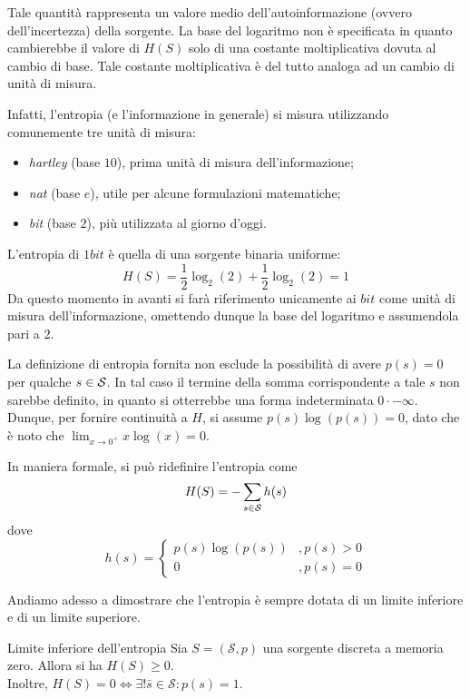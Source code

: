 Tale quantità rappresenta un valore medio dell'autoinformazione (ovvero dell'incertezza) della sorgente.
La base del logaritmo non è specificata in quanto cambierebbe il valore di $H(S)$ solo di una costante moltiplicativa dovuta al cambio di base. Tale costante moltiplicativa è del tutto analoga ad un cambio di unità di misura.

Infatti, l'entropia (e l'informazione in generale) si misura utilizzando comunemente tre unità di misura:
\begin{itemize}
  \item \emph{hartley} (base \(10\)), prima unità di misura dell'informazione;
  \item \emph{nat} (base \(e\)), utile per alcune formulazioni matematiche;
  \item \emph{bit} (base \(2\)), più utilizzata al giorno d'oggi.
\end{itemize}
L'entropia di \(1 bit\) è quella di una sorgente binaria uniforme:
\[H(S) = \frac{1}{2}\log_2(2) + \frac{1}{2}\log_2(2) = 1\]
Da questo momento in avanti si farà riferimento unicamente ai \(bit\) come unità di misura dell'informazione, omettendo dunque la base del logaritmo e assumendola pari a $2$.

\begin{note}[label=note:entropy-continuity-assumption]{}
  La definizione di entropia fornita non esclude la possibilità di avere \(p(s) = 0\) per qualche \(s \in \mathcal{S}\).
  In tal caso il termine della somma corrispondente a tale \(s\) non sarebbe definito, in quanto si otterrebbe una forma indeterminata $0\cdot -\infty$.
  Dunque, per fornire continuità a $H$, si assume \(p(s)\log\left(p(s)\right) = 0\), dato che è noto che \(\lim_{x \to 0^+} x \log\left(x\right) = 0\).

  In maniera formale, si può ridefinire l'entropia come
  \[H(S) = -\sum_{s \in \mathcal{S}} h(s)\]
  dove
  \[h(s) = \begin{cases}
              p(s) \log\left(p(s)\right) & , p(s) > 0 \\
              0 & , p(s) = 0
            \end{cases}
  \]
\end{note}

Andiamo adesso a dimostrare che l'entropia è sempre dotata di un limite inferiore e di un limite superiore.

\begin{proposition}[label=prop:lower_bound_entropy]{Limite inferiore dell'entropia}
  Sia $S=(\mathcal{S},p)$ una sorgente discreta a memoria zero. Allora si ha $H(S)\geq 0$.\\
  Inoltre, $H(S)=0 \iff \exists !\bar{s}\in \mathcal{S}:p(s)=1$.
\end{proposition}

